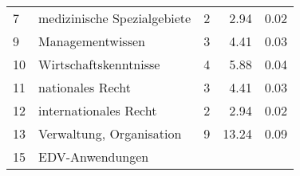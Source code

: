 \begin{longtable}{lXrrr}
     7 &
     \multicolumn{1}{X}{ medizinische Spezialgebiete   } &


       \num{2} &
       \num[round-mode=places,round-precision=2]{2,94} &
         \num[round-mode=places,round-precision=2]{0,02} \\

     9 &
     \multicolumn{1}{X}{ Managementwissen   } &


       \num{3} &
       \num[round-mode=places,round-precision=2]{4,41} &
         \num[round-mode=places,round-precision=2]{0,03} \\

     10 &
     \multicolumn{1}{X}{ Wirtschaftskenntnisse   } &


       \num{4} &
       \num[round-mode=places,round-precision=2]{5,88} &
         \num[round-mode=places,round-precision=2]{0,04} \\

     11 &
     \multicolumn{1}{X}{ nationales Recht   } &


       \num{3} &
       \num[round-mode=places,round-precision=2]{4,41} &
         \num[round-mode=places,round-precision=2]{0,03} \\

     12 &
     \multicolumn{1}{X}{ internationales Recht   } &


       \num{2} &
       \num[round-mode=places,round-precision=2]{2,94} &
         \num[round-mode=places,round-precision=2]{0,02} \\

     13 &
     \multicolumn{1}{X}{ Verwaltung, Organisation   } &


       \num{9} &
       \num[round-mode=places,round-precision=2]{13,24} &
         \num[round-mode=places,round-precision=2]{0,09} \\

     15 &
     \multicolumn{1}{X}{ EDV-Anwendungen   } &



\end{longtable}
